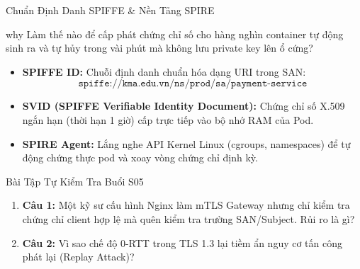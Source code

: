 \begin{frame}{Chuẩn Định Danh SPIFFE \& Nền Tảng SPIRE}
  \begin{beyond}{why}
    Làm thế nào để cấp phát chứng chỉ số cho hàng nghìn container tự động sinh ra và tự hủy trong vài phút mà không lưu private key lên ổ cứng?
  \end{beyond}

  \begin{itemize}\small
    \item \textbf{SPIFFE ID:} Chuỗi định danh chuẩn hóa dạng URI trong SAN:
      $$\texttt{spiffe://kma.edu.vn/ns/prod/sa/payment-service}$$
    \item \textbf{SVID (SPIFFE Verifiable Identity Document):} Chứng chỉ số X.509 ngắn hạn (thời hạn 1 giờ) cấp trực tiếp vào bộ nhớ RAM của Pod.
    \item \textbf{SPIRE Agent:} Lắng nghe API Kernel Linux (cgroups, namespaces) để tự động chứng thực pod và xoay vòng chứng chỉ định kỳ.
  \end{itemize}
\end{frame}

\begin{frame}{Bài Tập Tự Kiểm Tra Buổi S05}
  \begin{quizbox}
    \begin{enumerate}\footnotesize
      \item \textbf{Câu 1:} Một kỹ sư cấu hình Nginx làm mTLS Gateway nhưng chỉ kiểm tra chứng chỉ client hợp lệ mà quên kiểm tra trường SAN/Subject. Rủi ro là gì?
      \item \textbf{Câu 2:} Vì sao chế độ 0-RTT trong TLS 1.3 lại tiềm ẩn nguy cơ tấn công phát lại (Replay Attack)?
    \end{enumerate}
  \end{quizbox}
\end{frame}


